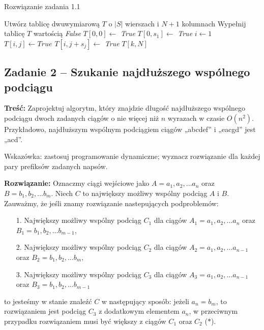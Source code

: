 \begin{algorithm}[H]
	\caption{Rozwiązanie zadania 1.1}\label{Zadanie11}
	\begin{algorithmic}[1]
		\State Utwórz tablicę dwuwymiarową $T$ o $|S|$ wierszach i $N + 1$ kolumnach 
		\State Wypełnij tablicę $T$ wartością \textit{False}
		\State $T[0, 0] \gets $ \textit{True}
		\State $T[0, s_1] \gets $ \textit{True}
		\State $i \gets 1$
		\State $T[i, j] \gets \textit{True}$
		\State $T[i, j + s_j] \gets$ \textit{True}
		\EndIf
		\EndIf
		\EndFor 
		\EndFor
		\State \Return $T[k, N]$
		\EndProcedure 
	\end{algorithmic}
\end{algorithm}

\subsection{Zadanie 2 -- Szukanie najdłuższego wspólnego podciągu}
\textbf{Treść:} Zaprojektuj algorytm, który znajdzie długość najdłuższego wspólnego podciągu dwoch zadanych ciągów
o nie więcej niż $n$ wyrazach w czasie $O(n^2)$. Przykładowo, najdłuższym wspólnym podciągiem 
ciągów „abcdef” i „eacgd” jest „acd”.

Wskazówka: zastosuj programowanie dynamiczne; wyznacz rozwiązanie dla każdej pary prefiksów zadanych napsów.

\textbf{Rozwiązanie:}
Oznaczmy ciągi wejściowe jako 
$A = a_1, a_2, \dots a_n$ oraz 
$B = b_1, b_2, \dots b_m$. Niech $C$ to największy możliwy
wspólny podciąg $A$ i $B$.  Zauważmy, że jeśli znamy rozwiązanie
nastepujących podproblemów:
\begin{itemize}
	\item[1.] Największy możliwy wspólny podciąg $C_1$ dla ciągów $A_1=a_1, a_2, \dots a_n$ oraz 
	$B_1=b_1, b_2, \dots b_{m-1}$,
	\item[2.] Największy możliwy wspólny podciąg $C_2$ dla ciągów $A_2 =a_1, a_2, \dots a_{n-1}$ oraz 
	$B_2=b_1, b_2, \dots b_{m}$,
	\item[3.] Największy możliwy wspólny podciąg $C_3$ dla ciągów $A_3=a_1, a_2, \dots a_{n-1}$ oraz 
	$B_3=b_1, b_2, \dots b_{m-1}$
\end{itemize}
to jesteśmy w stanie znaleźć $C$
w następujący sposób: jeżeli $a_n = b_m$, to rozwiązaniem 
jest podciąg $C_3$ z dodatkowym elementem $a_n$, w przeciwnym przypadku
rozwiązaniem musi być większy z ciągów $C_1$ oraz $C_2$ ($\ast$). 

